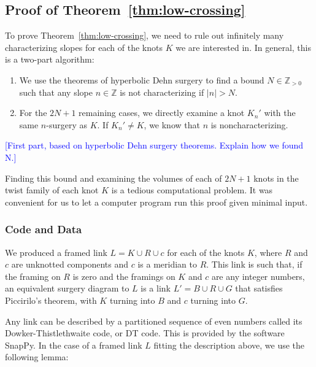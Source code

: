\documentclass[11pt,usenames,dvipsnames,reqno]{amsart}
\newcommand{\zz}{\mathbb{Z}}
\numberwithin{theorem}{section}
\theoremstyle{ex}
\theoremstyle{rem}
\def\kh#1{\textcolor{Blue}{#1}}
\begin{document}
\subsection{Proof of Theorem~\ref{thm:low-crossing}}

To prove Theorem~\ref{thm:low-crossing}, we need to rule out infinitely many characterizing slopes for each of the knots $K$ we are interested in. In general, this is a two-part algorithm:

\begin{enumerate}
	\item We use the theorems of hyperbolic Dehn surgery to find a bound $N \in \zz_{>0}$ such that any slope $n \in \zz$ is not characterizing if $|n|>N$.
	\item For the $2 N + 1$ remaining cases, we directly examine a knot $K_{n}'$ with the same $n$-surgery as $K$. If $K_{n}' \neq K$, we know that $n$ is noncharacterizing.
\end{enumerate}

\kh{[First part, based on hyperbolic Dehn surgery theorems. Explain how we found N.]}

Finding this bound and examining the volumes of each of $2 N + 1$ knots in the twist family of each knot $K$ is a tedious computational problem. It was convenient for us to let a computer program run this proof given minimal input.

\subsubsection{Code and Data}
We produced a framed link $L = K \cup R \cup c$ for each of the knots $K$, where $R$ and $c$ are unknotted components and $c$ is a meridian to $R$. This link is such that, if the framing on $R$ is zero and the framings on $K$ and $c$ are any integer numbers, an equivalent surgery diagram to $L$ is a link $L' = B \cup R \cup G$ that satisfies Piccirilo's theorem, with $K$ turning into $B$ and $c$ turning into $G$.

Any link can be described by a partitioned sequence of even numbers called its Dowker-Thistlethwaite  code, or DT code. This is provided by the software SnapPy. In the case of a framed link $L$ fitting the description above, we use the following lemma:
\end{document}

